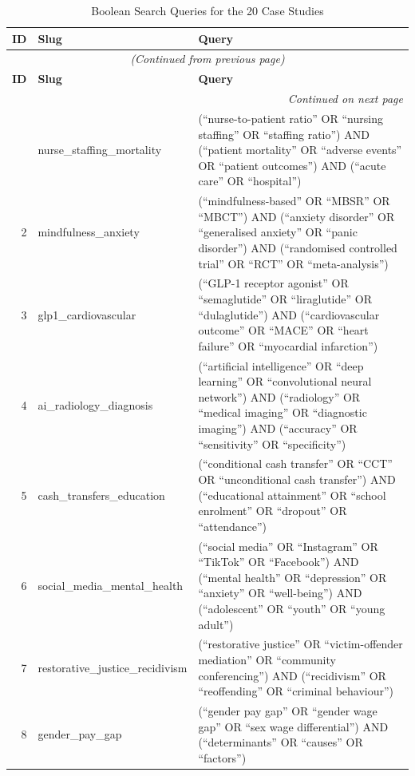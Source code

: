 \documentclass[12pt]{article}
\begin{document}
{\small
\begin{longtable}{r p{6cm} p{7.5cm}}  %
\caption{Boolean Search Queries for the 20 Case Studies}\label{tab:queries}\\
\toprule
\textbf{ID} & \textbf{Slug} & \textbf{Query} \\
\midrule
\endfirsthead
\multicolumn{3}{c}{\textit{(Continued from previous page)}} \\
\toprule
\textbf{ID} & \textbf{Slug} & \textbf{Query} \\
\midrule
\endhead
\midrule
\multicolumn{3}{r}{\textit{Continued on next page}} \\
\endfoot
\bottomrule
\endlastfoot
1 & nurse\_staffing\_mortality & (``nurse-to-patient ratio'' OR ``nursing staffing'' OR ``staffing ratio'') AND (``patient mortality'' OR ``adverse events'' OR ``patient outcomes'') AND (``acute care'' OR ``hospital'') \\
2 & mindfulness\_anxiety & (``mindfulness-based'' OR ``MBSR'' OR ``MBCT'') AND (``anxiety disorder'' OR ``generalised anxiety'' OR ``panic disorder'') AND (``randomised controlled trial'' OR ``RCT'' OR ``meta-analysis'') \\
3 & glp1\_cardiovascular & (``GLP-1 receptor agonist'' OR ``semaglutide'' OR ``liraglutide'' OR ``dulaglutide'') AND (``cardiovascular outcome'' OR ``MACE'' OR ``heart failure'' OR ``myocardial infarction'') \\
4 & ai\_radiology\_diagnosis & (``artificial intelligence'' OR ``deep learning'' OR ``convolutional neural network'') AND (``radiology'' OR ``medical imaging'' OR ``diagnostic imaging'') AND (``accuracy'' OR ``sensitivity'' OR ``specificity'') \\
5 & cash\_transfers\_education & (``conditional cash transfer'' OR ``CCT'' OR ``unconditional cash transfer'') AND (``educational attainment'' OR ``school enrolment'' OR ``dropout'' OR ``attendance'') \\
6 & social\_media\_mental\_health & (``social media'' OR ``Instagram'' OR ``TikTok'' OR ``Facebook'') AND (``mental health'' OR ``depression'' OR ``anxiety'' OR ``well-being'') AND (``adolescent'' OR ``youth'' OR ``young adult'') \\
7 & restorative\_justice\_recidivism & (``restorative justice'' OR ``victim-offender mediation'' OR ``community conferencing'') AND (``recidivism'' OR ``reoffending'' OR ``criminal behaviour'') \\
8 & gender\_pay\_gap & (``gender pay gap'' OR ``gender wage gap'' OR ``sex wage differential'') AND (``determinants'' OR ``causes'' OR ``factors'') \\

\end{longtable}}
\end{document}
